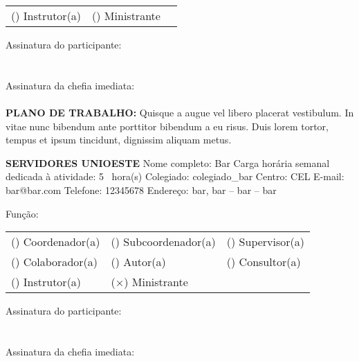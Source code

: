 \documentclass[12pt,a4paper,oneside]{article}%
\begin{document}
\begin{enumerate}
\begin{mdframed}[innertopmargin=5pt, innerleftmargin=3pt, innerrightmargin=3pt]
\begin{mdframed}[innertopmargin=5pt, innerleftmargin=3pt, innerrightmargin=3pt]
\begin{tabularx}{\linewidth}{XXX}
(\phantom{$\times$}) Instrutor(a) &(\phantom{$\times$}) Ministrante &\\%
\end{tabularx}%
\end{mdframed}%
\bigskip%
\bigskip%
Assinatura do participante: \hrulefill \\ \\ \\%
Assinatura da chefia imediata: \hrulefill \\ \\%
\textbf{PLANO DE TRABALHO: }%
Quisque a augue vel libero placerat vestibulum. In vitae nunc bibendum ante porttitor bibendum a eu risus. Duis lorem tortor, tempus et ipsum tincidunt, dignissim aliquam metus.%
\end{mdframed}%
\begin{mdframed}[innertopmargin=5pt, innerleftmargin=3pt, innerrightmargin=3pt]%
\textbf{SERVIDORES UNIOESTE }%
\newline%
Nome completo: %
Bar%
\newline%
Carga horária semanal dedicada à atividade: %
5%
\ hora(s) \hfill%
\newline%
Colegiado: %
colegiado\_bar%
\newline%
Centro: %
CEL%
\newline%
E-mail: %
bar@bar.com%
\newline%
Telefone: %
12345678%
\newline%
Endereço: %
bar, bar -- bar -- bar%
\newline%
\begin{mdframed}[innertopmargin=5pt, innerleftmargin=3pt, innerrightmargin=3pt]%
Função: %
\newline%
\begin{tabularx}{\linewidth}{XXX}%
(\phantom{$\times$}) Coordenador(a) &(\phantom{$\times$}) Subcoordenador(a) &(\phantom{$\times$}) Supervisor(a) \\%
(\phantom{$\times$}) Colaborador(a) &(\phantom{$\times$}) Autor(a) &(\phantom{$\times$}) Consultor(a) \\%
(\phantom{$\times$}) Instrutor(a) &($\times$) Ministrante&\\%
\end{tabularx}%
\end{mdframed}%
\bigskip%
\bigskip%
Assinatura do participante: \hrulefill \\ \\ \\%
Assinatura da chefia imediata: \hrulefill \\ \\%

\end{mdframed}
\end{enumerate}
\end{document}
